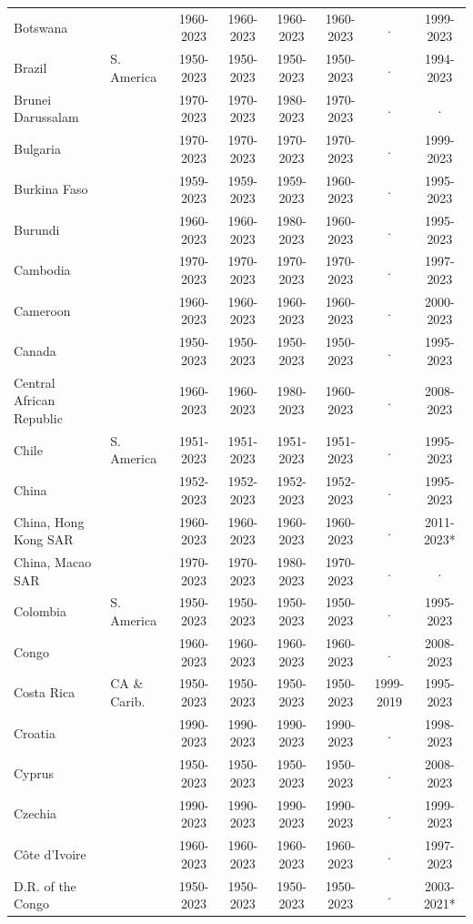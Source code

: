 \begin{longtable}{ll*{6}{c}}
Botswana &  & 1960-2023 & 1960-2023 & 1960-2023 & 1960-2023 & . & 1999-2023 \\
Brazil & S. America & 1950-2023 & 1950-2023 & 1950-2023 & 1950-2023 & . & 1994-2023 \\
Brunei Darussalam &  & 1970-2023 & 1970-2023 & 1980-2023 & 1970-2023 & . & . \\
Bulgaria &  & 1970-2023 & 1970-2023 & 1970-2023 & 1970-2023 & . & 1999-2023 \\
Burkina Faso &  & 1959-2023 & 1959-2023 & 1959-2023 & 1960-2023 & . & 1995-2023 \\
Burundi &  & 1960-2023 & 1960-2023 & 1980-2023 & 1960-2023 & . & 1995-2023 \\
Cambodia &  & 1970-2023 & 1970-2023 & 1970-2023 & 1970-2023 & . & 1997-2023 \\
Cameroon &  & 1960-2023 & 1960-2023 & 1960-2023 & 1960-2023 & . & 2000-2023 \\
Canada &  & 1950-2023 & 1950-2023 & 1950-2023 & 1950-2023 & . & 1995-2023 \\
Central African Republic &  & 1960-2023 & 1960-2023 & 1980-2023 & 1960-2023 & . & 2008-2023 \\
Chile & S. America & 1951-2023 & 1951-2023 & 1951-2023 & 1951-2023 & . & 1995-2023 \\
China &  & 1952-2023 & 1952-2023 & 1952-2023 & 1952-2023 & . & 1995-2023 \\
China, Hong Kong SAR &  & 1960-2023 & 1960-2023 & 1960-2023 & 1960-2023 & . & 2011-2023* \\
China, Macao SAR &  & 1970-2023 & 1970-2023 & 1980-2023 & 1970-2023 & . & . \\
Colombia & S. America & 1950-2023 & 1950-2023 & 1950-2023 & 1950-2023 & . & 1995-2023 \\
Congo &  & 1960-2023 & 1960-2023 & 1960-2023 & 1960-2023 & . & 2008-2023 \\
Costa Rica & CA \& Carib. & 1950-2023 & 1950-2023 & 1950-2023 & 1950-2023 & 1999-2019 & 1995-2023 \\
Croatia &  & 1990-2023 & 1990-2023 & 1990-2023 & 1990-2023 & . & 1998-2023 \\
Cyprus &  & 1950-2023 & 1950-2023 & 1950-2023 & 1950-2023 & . & 2008-2023 \\
Czechia &  & 1990-2023 & 1990-2023 & 1990-2023 & 1990-2023 & . & 1999-2023 \\
Côte d'Ivoire &  & 1960-2023 & 1960-2023 & 1960-2023 & 1960-2023 & . & 1997-2023 \\
D.R. of the Congo &  & 1950-2023 & 1950-2023 & 1950-2023 & 1950-2023 & . & 2003-2021* \\

\end{longtable}
